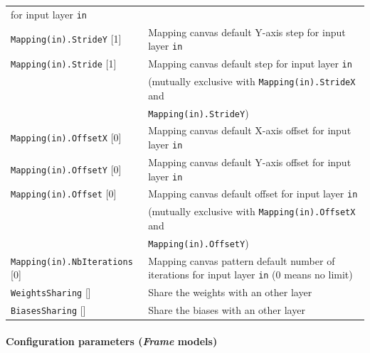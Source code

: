 \documentclass[a4paper,11pt,oneside]{article}
\begin{document}
\begin{center}
\begin{longtable}{| p{5cm} | p{10cm} | }
  for input layer \lstinline!in! \\
  \lstinline!Mapping(in).StrideY! [1] & Mapping canvas default Y-axis step
  for input layer \lstinline!in! \\
  \lstinline!Mapping(in).Stride! [1] & Mapping canvas default step
  for input layer \lstinline!in! \\
   & (mutually exclusive with \lstinline!Mapping(in).StrideX! and \\
   & \lstinline!Mapping(in).StrideY!) \\
  \lstinline!Mapping(in).OffsetX! [0] & Mapping canvas default X-axis offset
  for input layer \lstinline!in! \\
  \lstinline!Mapping(in).OffsetY! [0] & Mapping canvas default Y-axis offset
  for input layer \lstinline!in! \\
  \lstinline!Mapping(in).Offset! [0] & Mapping canvas default offset
  for input layer \lstinline!in! \\
   & (mutually exclusive with \lstinline!Mapping(in).OffsetX! and \\
   & \lstinline!Mapping(in).OffsetY!) \\
  \lstinline!Mapping(in).NbIterations! [0] & Mapping canvas pattern default
  number of iterations for input layer \lstinline!in! (0 means no limit) \\
  \lstinline!WeightsSharing! [] & Share the weights with an other layer \\
  \lstinline!BiasesSharing! [] & Share the biases with an other layer \\
 \hline
\end{longtable}
\end{center}

\paragraph{Configuration parameters (\emph{Frame} models)}
\end{document}
